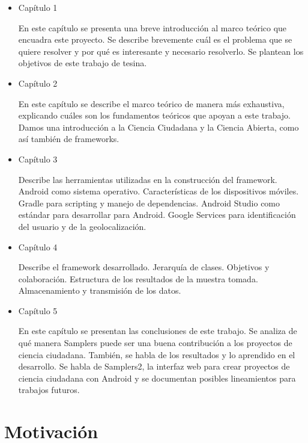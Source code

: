\begin{itemize} 
	\item{Capítulo 1} 
		\begin{description} En este capítulo se presenta una breve introducción al marco teórico que encuadra este proyecto. Se describe brevemente cuál es el problema que se quiere resolver y por qué es interesante y necesario resolverlo. Se plantean los objetivos de este trabajo de tesina.
		\end{description}

	\item{Capítulo 2} 
		\begin{description} En este capítulo se describe el marco teórico de manera más exhaustiva, explicando cuáles son los fundamentos teóricos que apoyan a este trabajo. Damos una introducción a la Ciencia Ciudadana y la Ciencia Abierta, como así también de frameworks.
		\end{description}
	
	\item{Capítulo 3} 
		\begin{description} Describe las herramientas utilizadas en la construcción del framework. Android como sistema operativo. Características de los dispositivos móviles. Gradle para scripting y manejo de dependencias. Android Studio como estándar para desarrollar para Android. Google Services para identificación del usuario y de la geolocalización. 
		\end{description}
	
	\item{Capítulo 4} 
		\begin{description} Describe el framework desarrollado. Jerarquía de clases. Objetivos y colaboración. Estructura de los resultados de la muestra tomada. Almacenamiento y transmisión de los datos.
		\end{description}

	\item{Capítulo 5} 
		\begin{description} En este capítulo se presentan las conclusiones de este trabajo. Se analiza de qué manera Samplers puede ser una buena contribución a los proyectos de ciencia ciudadana. También, se habla de los resultados y lo aprendido en el desarrollo. Se habla de Samplers2, la interfaz web para crear proyectos de ciencia ciudadana con Android y se documentan posibles lineamientos para trabajos futuros.
		\end{description}
\end{itemize}
\section{ Motivación }

